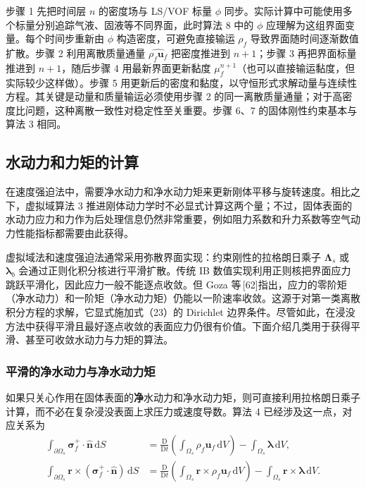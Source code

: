 \documentclass[UTF8,11pt,a4paper]{ctexart}
\newcommand{\dd}{\,\mathrm{d}}
\newcommand{\D}{\mathrm{D}}
\begin{document}
步骤 1 先把时间层 $n$ 的密度场与 LS/VOF 标量 $\phi$ 同步。实际计算中可能使用多个标量分别追踪气液、固液等不同界面，此时算法 8 中的 $\phi$ 应理解为这组界面变量。每个时间步重新由 $\phi$ 构造密度，可避免直接输运 $\rho_f$ 导致界面随时间逐渐数值扩散。步骤 2 利用离散质量通量 $\widehat{\rho_f\bm u_f}$ 把密度推进到 $n+1$；步骤 3 再把界面标量推进到 $n+1$，随后步骤 4 用最新界面更新黏度 $\mu_f^{n+1}$（也可以直接输运黏度，但实际较少这样做）。步骤 5 用更新后的密度和黏度，以守恒形式求解动量与连续性方程。其关键是动量和质量输运必须使用步骤 2 的同一离散质量通量；对于高密度比问题，这种离散一致性对稳定性至关重要。步骤 6、7 的固体刚性约束基本与算法 3 相同。

\subsection{水动力和力矩的计算}

在速度强迫法中，需要净水动力和净水动力矩来更新刚体平移与旋转速度。相比之下，虚拟域算法 3 推进刚体动力学时不必显式计算这两个量；不过，固体表面的水动力应力和力作为后处理信息仍然非常重要，例如阻力系数和升力系数等空气动力性能指标都需要由此获得。

虚拟域法和速度强迫法通常采用弥散界面实现：约束刚性的拉格朗日乘子 $\bm\Lambda_s$ 或 $\bm\lambda_b$ 会通过正则化积分核进行平滑扩散。传统 IB 数值实现利用正则核把界面应力跳跃平滑化，因此应力一般不能逐点收敛。但 Goza 等\,[62]指出，应力的零阶矩（净水动力）和一阶矩（净水动力矩）仍能以一阶速率收敛。这源于对第一类离散积分方程的求解，它显式施加式（23）的 Dirichlet 边界条件。尽管如此，在浸没方法中获得平滑且最好逐点收敛的表面应力仍很有价值。下面介绍几类用于获得平滑、甚至可收敛水动力与力矩的算法。

\subsubsection{平滑的净水动力与净水动力矩}

如果只关心作用在固体表面的\textbf{净}水动力和净水动力矩，则可直接利用拉格朗日乘子计算，而不必在复杂浸没表面上求压力或速度导数。算法 4 已经涉及这一点，对应关系为
\begin{align}
\int_{\partial\Omega_s}\bm\sigma_f^{+}\cdot\hat{\bm n}\dd S
&=\frac{\D}{\D t}\left(\int_{\Omega_s}\rho_f\bm u_f\dd V\right)-\int_{\Omega_s}\bm\lambda\dd V, \tag{55}\\
\int_{\partial\Omega_s}\bm r\times(\bm\sigma_f^{+}\cdot\hat{\bm n})\dd S
&=\frac{\D}{\D t}\left(\int_{\Omega_s}\bm r\times\rho_f\bm u_f\dd V\right)
-\int_{\Omega_s}\bm r\times\bm\lambda\dd V. \tag{56}
\end{align}
\end{document}
